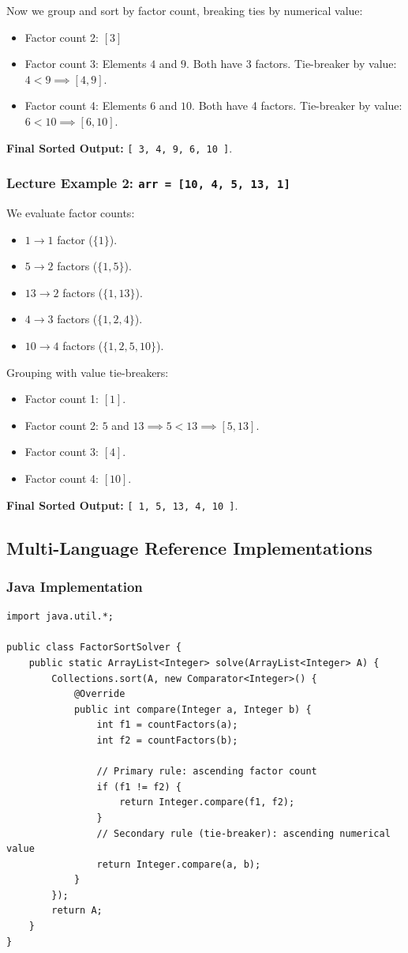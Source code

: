 \documentclass[10pt,journal,compsoc,onecolumn]{IEEEtran}
\begin{document}
Now we group and sort by factor count, breaking ties by numerical value:
\begin{itemize}
    \item Factor count 2: $[3]$
    \item Factor count 3: Elements $4$ and $9$. Both have 3 factors. Tie-breaker by value: $4 < 9 \implies [4, 9]$.
    \item Factor count 4: Elements $6$ and $10$. Both have 4 factors. Tie-breaker by value: $6 < 10 \implies [6, 10]$.
\end{itemize}
\textbf{Final Sorted Output:} \texttt{[ 3, 4, 9, 6, 10 ]}.

\subsubsection{Lecture Example 2: \texttt{arr = [10, 4, 5, 13, 1]}}
We evaluate factor counts:
\begin{itemize}
    \item $1 \to 1$ factor ($\{1\}$).
    \item $5 \to 2$ factors ($\{1, 5\}$).
    \item $13 \to 2$ factors ($\{1, 13\}$).
    \item $4 \to 3$ factors ($\{1, 2, 4\}$).
    \item $10 \to 4$ factors ($\{1, 2, 5, 10\}$).
\end{itemize}
Grouping with value tie-breakers:
\begin{itemize}
    \item Factor count 1: $[1]$.
    \item Factor count 2: $5$ and $13 \implies 5 < 13 \implies [5, 13]$.
    \item Factor count 3: $[4]$.
    \item Factor count 4: $[10]$.
\end{itemize}
\textbf{Final Sorted Output:} \texttt{[ 1, 5, 13, 4, 10 ]}.

\subsection{Multi-Language Reference Implementations}

\subsubsection{Java Implementation}
\begin{verbatim}
import java.util.*;

public class FactorSortSolver {
    public static ArrayList<Integer> solve(ArrayList<Integer> A) {
        Collections.sort(A, new Comparator<Integer>() {
            @Override
            public int compare(Integer a, Integer b) {
                int f1 = countFactors(a);
                int f2 = countFactors(b);

                // Primary rule: ascending factor count
                if (f1 != f2) {
                    return Integer.compare(f1, f2);
                }
                // Secondary rule (tie-breaker): ascending numerical value
                return Integer.compare(a, b);
            }
        });
        return A;
    }
}
\end{verbatim}
\end{document}
